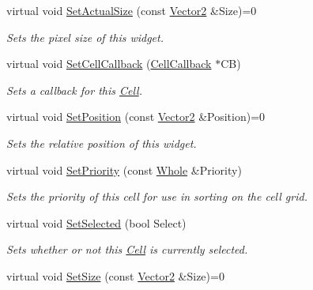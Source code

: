 \begin{DoxyCompactItemize}
virtual void \hyperlink{classMezzanine_1_1UI_1_1Cell_a4861322821bdd28429994ab49bea6083}{SetActualSize} (const \hyperlink{classMezzanine_1_1Vector2}{Vector2} \&Size)=0
\begin{DoxyCompactList}\small\item\em Sets the pixel size of this widget. \item\end{DoxyCompactList}\item 
virtual void \hyperlink{classMezzanine_1_1UI_1_1Cell_a8d4d280682b38703d114e073c002e757}{SetCellCallback} (\hyperlink{classMezzanine_1_1UI_1_1CellCallback}{CellCallback} $\ast$CB)
\begin{DoxyCompactList}\small\item\em Sets a callback for this \hyperlink{classMezzanine_1_1UI_1_1Cell}{Cell}. \item\end{DoxyCompactList}\item 
virtual void \hyperlink{classMezzanine_1_1UI_1_1Cell_a50efe6a1d981f4de5bfa4124ab9dd256}{SetPosition} (const \hyperlink{classMezzanine_1_1Vector2}{Vector2} \&Position)=0
\begin{DoxyCompactList}\small\item\em Sets the relative position of this widget. \item\end{DoxyCompactList}\item 
virtual void \hyperlink{classMezzanine_1_1UI_1_1Cell_af728d8b2287b70c2d0956249e0afcd53}{SetPriority} (const \hyperlink{namespaceMezzanine_adcbb6ce6d1eb4379d109e51171e2e493}{Whole} \&Priority)
\begin{DoxyCompactList}\small\item\em Sets the priority of this cell for use in sorting on the cell grid. \item\end{DoxyCompactList}\item 
virtual void \hyperlink{classMezzanine_1_1UI_1_1Cell_ace3c3a5b3dc357ec8db0d164ff1ac50c}{SetSelected} (bool Select)
\begin{DoxyCompactList}\small\item\em Sets whether or not this \hyperlink{classMezzanine_1_1UI_1_1Cell}{Cell} is currently selected. \item\end{DoxyCompactList}\item 
virtual void \hyperlink{classMezzanine_1_1UI_1_1Cell_a07e76896846e18c9d7d72ba7b9c49ed3}{SetSize} (const \hyperlink{classMezzanine_1_1Vector2}{Vector2} \&Size)=0

\end{DoxyCompactItemize}
